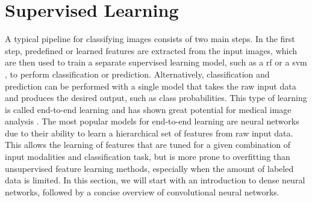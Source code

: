 

\section[Supervised learning]{Supervised Learning}


A typical pipeline for classifying images consists of two main steps. In the
first step, predefined or learned features are extracted from the input images,
which are then used to train a separate supervised learning model, such as a
\gls{rf} \citep{breiman2001} or a \gls{svm} \citep{cortes1995},
to perform classification or prediction. Alternatively, classification and
prediction can be performed with a single model that takes the raw input data
and produces the desired output, such as class probabilities. This type of
learning is called end-to-end learning and has shown great potential for medical
image analysis \citep{ciresan2012}. The most popular models for end-to-end
learning are neural networks due to their ability to learn a hierarchical set of
features from raw input data. This allows the learning of features that are
tuned for a given combination of input modalities and classification task, but
is more prone to overfitting than unsupervised feature learning methods,
especially when the amount of labeled data is limited. In this section, we will
start with an introduction to dense neural networks, followed by a concise
overview of convolutional neural networks.



